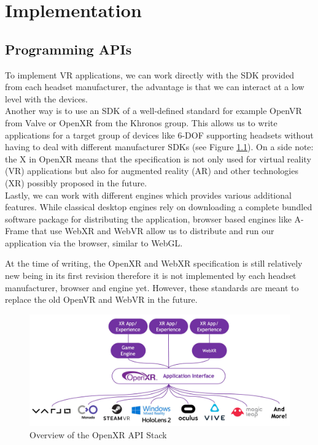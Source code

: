 \chapter{Implementation}
\label{chap:Impl}
\section{Programming APIs}

To implement VR applications, we can work directly with the SDK provided from each headset manufacturer, the advantage is that we can interact at a low level with the devices.\\ 
Another way is to use an SDK of a well-defined standard for example OpenVR from Valve or OpenXR from the Khronos group. This allows us to write applications for a target group of devices like 6-DOF supporting headsets without having to deal with different manufacturer SDKs (see Figure \ref{fig:openxr-overview}). On a side note: the X in OpenXR means that the specification is not only used for virtual reality (VR) applications but also for augmented reality (AR) and other technologies (XR) possibly proposed in the future.\\
Lastly, we can work with different engines which provides various additional features. While classical desktop engines rely on downloading a complete bundled software package for distributing the application, browser based engines like A-Frame that use WebXR and WebVR allow us to distribute and run our application via the browser, similar to WebGL.

At the time of writing, the OpenXR and WebXR specification is still relatively new being in its first revision therefore it is not implemented by each headset manufacturer, browser and engine yet. However, these standards are meant to replace the old OpenVR and WebVR in the future.

\begin{figure}[!hbt]
    \centering
    \includegraphics[width=\textwidth]{graphics/openXR-overview.jpg}
    \caption{Overview of the OpenXR API Stack \cite{khronosGroupOpenXR}}
    \label{fig:openxr-overview}
\end{figure}

